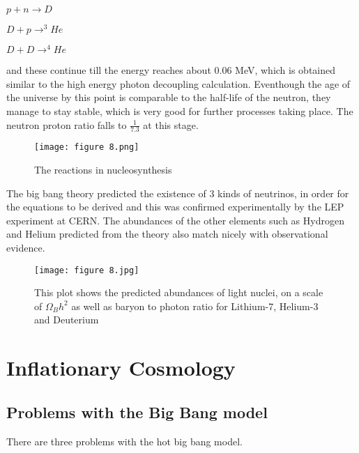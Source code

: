 \documentclass{article}
\begin{document}
\begin{center}
    $p + n \rightarrow D$
\end{center}

\begin{center}
    $D + p \rightarrow ^{3}He$
\end{center}

\begin{center}
    $D + D \rightarrow ^{4}He$
\end{center}

and these continue till the energy reaches about 0.06 MeV, which is obtained similar to the high energy photon decoupling calculation. Eventhough the age of the universe by this point is comparable to the half-life of the neutron, they manage to stay stable, which is very good for further processes taking place. The neutron proton ratio falls to $\frac{1}{7.3}$ at this stage.

\begin{figure}[H]
    \centering
    \texttt{[image: figure 8.png]}
    \caption{The reactions in nucleosynthesis}
    \label{fig:nsyn}
\end{figure}

The big bang theory predicted the existence of 3 kinds of neutrinos, in order for the equations to be derived and this was confirmed experimentally by the LEP experiment at CERN. The abundances of the other elements such as Hydrogen and Helium predicted from the theory also match nicely with observational evidence.

\begin{figure}[H]
    \centering
    \texttt{[image: figure 8.jpg]}
    \caption{This plot shows the predicted abundances of light nuclei, on a scale of $\Omega_{B}h^2$ as well as baryon to photon ratio for Lithium-7, Helium-3 and Deuterium}
    \label{fig:abundance}
\end{figure}

\section{Inflationary Cosmology}
\subsection{Problems with the Big Bang model}
 There are three problems with the hot big bang model.
\end{document}

